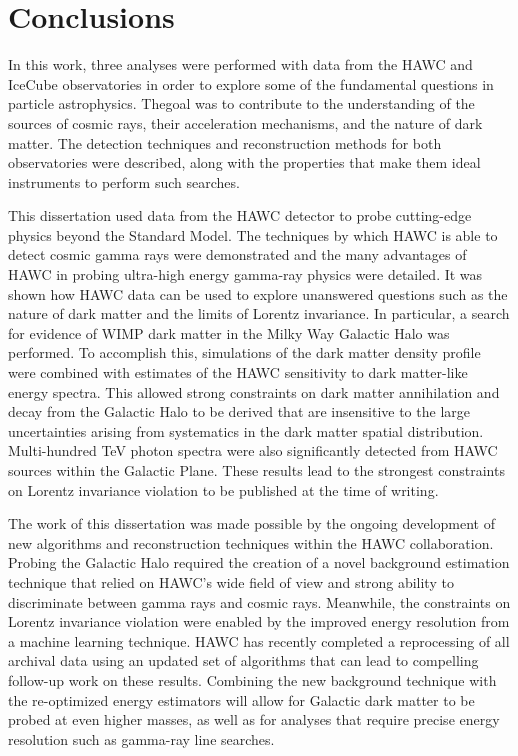 \section{Conclusions}\label{sec:conclusions}

In this work, three analyses were performed with data from the HAWC and IceCube observatories in order to explore some of the fundamental questions in particle astrophysics.
Thegoal was to contribute to the understanding of the sources of cosmic rays, their acceleration mechanisms, and the nature of dark matter. The detection techniques and reconstruction methods for both observatories were described, along with the properties that make them ideal instruments to perform such searches.

This dissertation used data from the HAWC detector to probe cutting-edge physics beyond the Standard Model.
The techniques by which HAWC is able to detect cosmic gamma rays were
demonstrated and the many advantages of HAWC in probing ultra-high energy gamma-ray physics were detailed.
It was shown how HAWC data can be used to explore unanswered questions such as the nature of dark matter and the limits of Lorentz invariance.
In particular, a search for evidence of WIMP dark matter in the Milky Way Galactic Halo was performed.
To accomplish this, simulations of the dark matter density profile were combined with estimates of the HAWC sensitivity to dark matter-like energy spectra.
This allowed strong constraints on dark matter annihilation and decay from the Galactic Halo to be derived that are insensitive to the large uncertainties arising from systematics in the dark matter spatial distribution.
Multi-hundred TeV photon spectra were also significantly detected from HAWC sources within the Galactic Plane. These results lead to the strongest constraints on Lorentz invariance violation to be published at the time of writing.

The work of this dissertation was made possible by the ongoing development of new algorithms and reconstruction techniques within the HAWC collaboration.
Probing the Galactic Halo required the creation of a novel background estimation technique that relied on HAWC’s wide field of view and strong ability to discriminate between gamma rays and cosmic rays.
Meanwhile, the constraints on Lorentz invariance violation were enabled by the improved energy resolution from a machine learning technique.
HAWC has recently completed a reprocessing of all archival data using an updated set of algorithms that can lead to compelling follow-up work on these results.
Combining the new background technique with the re-optimized energy estimators will allow for Galactic dark matter to be probed at even higher masses, as well as for analyses that require precise energy resolution such as gamma-ray line searches.


